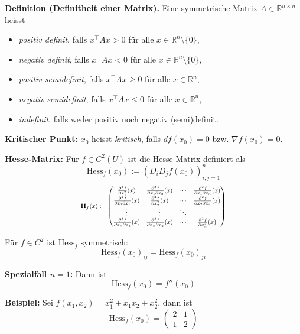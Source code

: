 \textbf{Definition (Definitheit einer Matrix).} Eine symmetrische Matrix \( A \in \mathbb{R}^{n \times n} \) heisst
\begin{itemize}
  \item \textit{positiv definit}, falls \( x^\top A x > 0 \) für alle \( x \in \mathbb{R}^n \setminus \{0\} \),
  \item \textit{negativ definit}, falls \( x^\top A x < 0 \) für alle \( x \in \mathbb{R}^n \setminus \{0\} \),
  \item \textit{positiv semidefinit}, falls \( x^\top A x \geq 0 \) für alle \( x \in \mathbb{R}^n \),
  \item \textit{negativ semidefinit}, falls \( x^\top A x \leq 0 \) für alle \( x \in \mathbb{R}^n \),
  \item \textit{indefinit}, falls weder positiv noch negativ (semi)definit.
\end{itemize}


\textbf{Kritischer Punkt:} $x_0$ heisst \textit{kritisch}, falls $df(x_0) = 0$ bzw. $\nabla f(x_0) = 0$.

\textbf{Hesse-Matrix:} Für $f \in C^2(U)$ ist die Hesse-Matrix definiert als
\[
\text{Hess}_f(x_0) := \left(D_i D_j f(x_0)\right)_{i,j=1}^n
\]
\[
\scalebox{0.75}{$
\mathbf{H}_f(x) :=
\begin{pmatrix}
\frac{\partial^2 f}{\partial x_1^2}(x) & \frac{\partial^2 f}{\partial x_1 \partial x_2}(x) & \cdots & \frac{\partial^2 f}{\partial x_1 \partial x_n}(x) \\
\frac{\partial^2 f}{\partial x_2 \partial x_1}(x) & \frac{\partial^2 f}{\partial x_2^2}(x) & \cdots & \frac{\partial^2 f}{\partial x_2 \partial x_n}(x) \\
\vdots & \vdots & \ddots & \vdots \\
\frac{\partial^2 f}{\partial x_n \partial x_1}(x) & \frac{\partial^2 f}{\partial x_n \partial x_2}(x) & \cdots & \frac{\partial^2 f}{\partial x_n^2}(x)
\end{pmatrix}
$}
\]


Für $f \in C^2$ ist $\text{Hess}_f$ symmetrisch:
\[
\text{Hess}_f(x_0)_{ij} = \text{Hess}_f(x_0)_{ji}
\]

\textbf{Spezialfall $n = 1$:} Dann ist
\[
\text{Hess}_f(x_0) = f''(x_0)
\]

\textbf{Beispiel:} Sei $f(x_1, x_2) = x_1^2 + x_1 x_2 + x_2^2$, dann ist
\[
\text{Hess}_f(x_0) = 
\begin{pmatrix}
2 & 1 \\
1 & 2
\end{pmatrix}
\]

